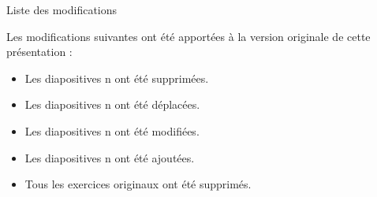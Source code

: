 
\begin{frame}{Liste des modifications}
	
	Les modifications suivantes ont été apportées à la version originale de cette présentation :
	\begin{itemize}
		\item Les diapositives n ont été supprimées.
		\item Les diapositives n ont été déplacées.
		\item Les diapositives n ont été modifiées.
		\item Les diapositives n ont été ajoutées.
		\item Tous les exercices originaux ont été supprimés.
	\end{itemize}
\end{frame}
